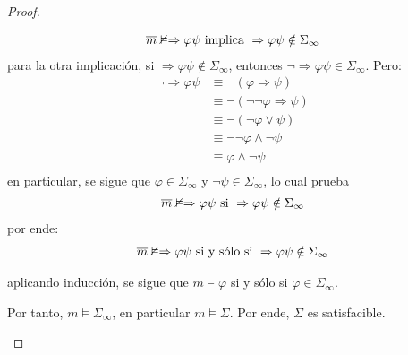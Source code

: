 \documentclass[12pt]{report}
\theoremstyle{largebreak}
\begin{document}
\begin{proof}
\begin{itemize}
\begin{itemize}
                \begin{equation*}
                    \begin{split}
                        \overline{m}\nvDash\Rightarrow\varphi\psi&\textup{ implica }\Rightarrow\varphi\psi\notin\Sigma_{\infty}\\
                    \end{split}
                \end{equation*}
                para la otra implicación, si $\Rightarrow\varphi\psi\notin\Sigma_{\infty}$, entonces $\neg\Rightarrow\varphi\psi\in\Sigma_\infty$. Pero:
                \begin{equation*}
                    \begin{split}
                        \neg\Rightarrow\varphi\psi&\equiv\neg(\varphi\Rightarrow\psi)\\
                        &\equiv\neg(\neg\neg\varphi\Rightarrow\psi)\\
                        &\equiv\neg(\neg\varphi\lor\psi)\\
                        &\equiv\neg\neg\varphi\land\neg\psi\\
                        &\equiv\varphi\land\neg\psi\\
                    \end{split}
                \end{equation*}
                en particular, se sigue que $\varphi\in\Sigma_{\infty}$ y $\neg\psi\in\Sigma_{\infty}$, lo cual prueba
                \begin{equation*}
                    \begin{split}
                        \overline{m}\nvDash\Rightarrow\varphi\psi&\textup{ si }\Rightarrow\varphi\psi\notin\Sigma_{\infty}\\
                    \end{split}
                \end{equation*}
                por ende:
                \begin{equation*}
                    \begin{split}
                        \overline{m}\nvDash\Rightarrow\varphi\psi&\textup{ si y sólo si }\Rightarrow\varphi\psi\notin\Sigma_{\infty}\\
                    \end{split}
                \end{equation*}
            \end{itemize}
            aplicando inducción, se sigue que $m\vDash\varphi$ si y sólo si $\varphi\in\Sigma_{\infty}$.

            Por tanto, $m\vDash\Sigma_{\infty}$, en particular $m\vDash\Sigma$. Por ende, $\Sigma$ es satisfacible.
        \end{itemize}
    \end{proof}
\end{document}
